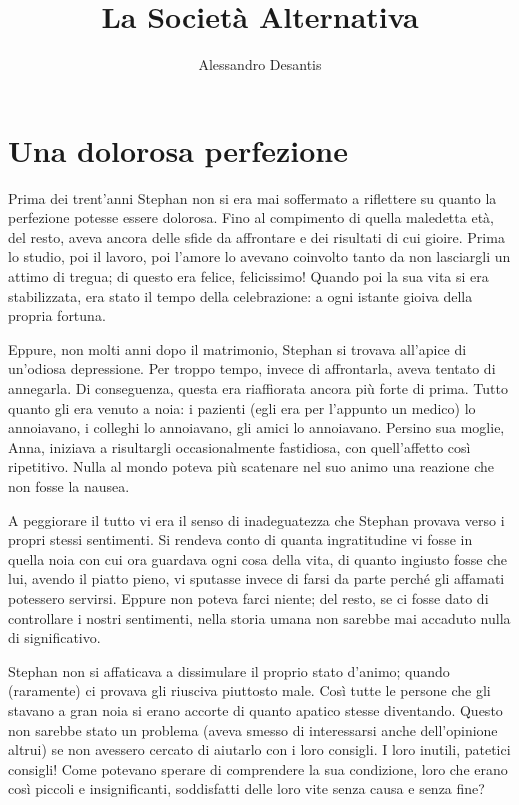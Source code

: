 \documentclass[a4paper,12pt,oneside]{memoir}
\title{La Società Alternativa}
\author{Alessandro Desantis}
\begin{document}
\begin{titlingpage}
\maketitle
\end{titlingpage}

\chapter{Una dolorosa perfezione}

Prima dei trent'anni Stephan non si era mai soffermato a riflettere su quanto la
perfezione potesse essere dolorosa. Fino al compimento di quella maledetta età,
del resto, aveva ancora delle sfide da affrontare e dei risultati di cui gioire.
Prima lo studio, poi il lavoro, poi l'amore lo avevano coinvolto tanto da non
lasciargli un attimo di tregua; di questo era felice, felicissimo! Quando poi la
sua vita si era stabilizzata, era stato il tempo della celebrazione: a ogni
istante gioiva della propria fortuna.

Eppure, non molti anni dopo il matrimonio, Stephan si trovava all'apice di
un'odiosa depressione. Per troppo tempo, invece di affrontarla, aveva tentato di
annegarla. Di conseguenza, questa era riaffiorata ancora più forte di prima.
Tutto quanto gli era venuto a noia: i pazienti (egli era per l'appunto un
medico) lo annoiavano, i colleghi lo annoiavano, gli amici lo annoiavano.
Persino sua moglie, Anna, iniziava a risultargli occasionalmente fastidiosa, con
quell'affetto così ripetitivo. Nulla al mondo poteva più scatenare nel suo animo
una reazione che non fosse la nausea.

A peggiorare il tutto vi era il senso di inadeguatezza che Stephan provava verso
i propri stessi sentimenti. Si rendeva conto di quanta ingratitudine vi fosse in
quella noia con cui ora guardava ogni cosa della vita, di quanto ingiusto fosse
che lui, avendo il piatto pieno, vi sputasse invece di farsi da parte perché gli
affamati potessero servirsi. Eppure non poteva farci niente; del resto, se ci
fosse dato di controllare i nostri sentimenti, nella storia umana non sarebbe
mai accaduto nulla di significativo.

Stephan non si affaticava a dissimulare il proprio stato d'animo; quando
(raramente) ci provava gli riusciva piuttosto male. Così tutte le persone che
gli stavano a gran noia si erano accorte di quanto apatico stesse diventando.
Questo non sarebbe stato un problema (aveva smesso di interessarsi anche
dell'opinione altrui) se non avessero cercato di aiutarlo con i loro consigli.
I loro inutili, patetici consigli! Come potevano sperare di comprendere la sua
condizione, loro che erano così piccoli e insignificanti, soddisfatti delle loro
vite senza causa e senza fine?
\end{document}
